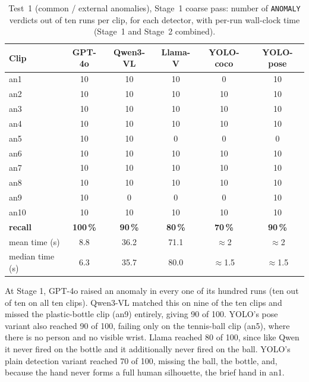 \documentclass[11pt,a4paper]{article}
\begin{document}
\begin{table}[h]
\centering
\small
\setlength{\tabcolsep}{5pt}
\begin{tabular}{@{}l ccc cc@{}}
\toprule
Clip & GPT-4o & Qwen3-VL & Llama-V & YOLO-coco & YOLO-pose \\
\midrule
an1  & 10 & 10 & 10 & 0  & 10 \\
an2  & 10 & 10 & 10 & 10 & 10 \\
an3  & 10 & 10 & 10 & 10 & 10 \\
an4  & 10 & 10 & 10 & 10 & 10 \\
an5  & 10 & 10 & 0  & 0  & 0 \\
an6  & 10 & 10 & 10 & 10 & 10 \\
an7  & 10 & 10 & 10 & 10 & 10 \\
an8  & 10 & 10 & 10 & 10 & 10 \\
an9  & 10 & 0  & 0  & 0  & 10 \\
an10 & 10 & 10 & 10 & 10 & 10 \\
\midrule
\textbf{recall} & \textbf{100\,\%} & \textbf{90\,\%} & \textbf{80\,\%}
                & \textbf{70\,\%} & \textbf{90\,\%} \\
\midrule
mean time (s)   & 8.8 & 36.2 & 71.1 & $\approx$2 & $\approx$2 \\
median time (s) & 6.3 & 35.7 & 80.0 & $\approx$1.5 & $\approx$1.5 \\
\bottomrule
\end{tabular}
\caption{Test~1 (common / external anomalies), Stage~1 coarse pass:
number of \texttt{ANOMALY} verdicts out of ten runs per clip, for each
detector, with per-run wall-clock time (Stage~1 and Stage~2 combined).}
\label{tab:test1-stage1}
\end{table}
\FloatBarrier

At Stage 1, GPT-4o raised an anomaly in every one of its hundred runs
(ten out of ten on all ten clips). Qwen3-VL matched this on nine of the
ten clips and missed the plastic-bottle clip (an9) entirely, giving 90 of
100. YOLO's pose variant also reached 90 of 100, failing only on the
tennis-ball clip (an5), where there is no person and no visible wrist.
Llama reached 80 of 100, since like Qwen it never fired on the bottle and
it additionally never fired on the ball. YOLO's plain detection variant
reached 70 of 100, missing the ball, the bottle, and, because the hand
never forms a full human silhouette, the brief hand in an1.
\end{document}
